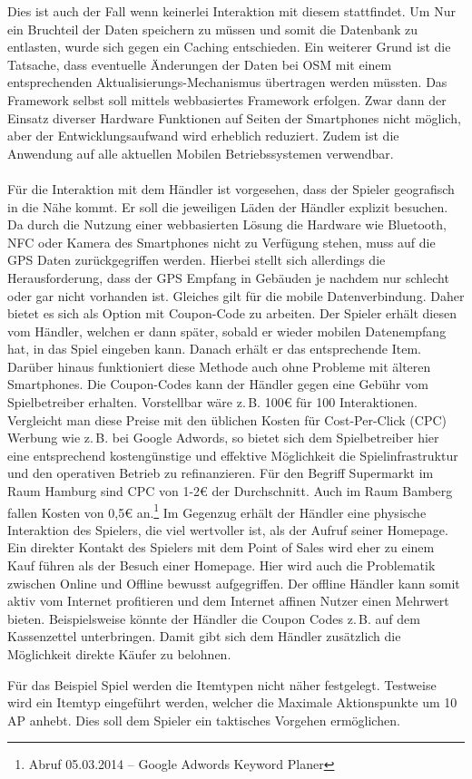 Dies ist auch der Fall wenn keinerlei Interaktion mit diesem stattfindet. Um Nur ein Bruchteil der Daten speichern zu müssen und somit die Datenbank zu entlasten, wurde sich gegen ein Caching entschieden. Ein weiterer Grund ist die Tatsache, dass eventuelle Änderungen der Daten bei OSM mit einem entsprechenden Aktualisierungs-Mechanismus übertragen werden müssten.
Das Framework selbst soll mittels webbasiertes Framework erfolgen.
Zwar dann der Einsatz diverser Hardware Funktionen auf Seiten der Smartphones nicht möglich, aber der Entwicklungsaufwand wird erheblich reduziert. Zudem ist die Anwendung auf alle aktuellen Mobilen Betriebssystemen verwendbar.
\\\\
Für die Interaktion mit dem Händler ist vorgesehen, dass der Spieler geografisch in die Nähe kommt. Er soll die jeweiligen Läden der Händler explizit besuchen. Da durch die Nutzung einer webbasierten Lösung die Hardware wie Bluetooth, NFC oder Kamera des Smartphones nicht zu Verfügung stehen, muss auf die GPS Daten zurückgegriffen werden.
Hierbei stellt sich allerdings die Herausforderung, dass der GPS Empfang in Gebäuden je nachdem nur schlecht oder gar nicht vorhanden ist. Gleiches gilt für die mobile Datenverbindung. Daher bietet es sich als Option mit Coupon-Code zu arbeiten. Der Spieler erhält diesen vom Händler, welchen er dann später, sobald er wieder mobilen Datenempfang hat, in das Spiel eingeben kann. Danach erhält er das entsprechende Item. Darüber hinaus funktioniert diese Methode auch ohne Probleme mit älteren Smartphones. Die Coupon-Codes kann der Händler gegen eine Gebühr vom Spielbetreiber erhalten. Vorstellbar wäre z.\,B. 100€ für 100 Interaktionen. Vergleicht man diese Preise mit den üblichen Kosten für Cost-Per-Click (CPC) Werbung wie z.\,B. bei Google Adwords, so bietet sich dem Spielbetreiber hier eine entsprechend kostengünstige und effektive Möglichkeit die Spielinfrastruktur und den operativen Betrieb zu refinanzieren.\cite{Guerini.2010} Für den Begriff Supermarkt im Raum Hamburg sind CPC von 1-2€ der Durchschnitt. Auch im Raum Bamberg fallen Kosten von 0,5€ an.\footnote{Abruf 05.03.2014 -- Google Adwords Keyword Planer} Im Gegenzug erhält der Händler eine physische Interaktion des Spielers, die viel wertvoller ist, als der Aufruf seiner Homepage. Ein direkter Kontakt des Spielers mit dem Point of Sales wird eher zu einem Kauf führen als der Besuch einer Homepage. Hier wird auch die Problematik zwischen Online und Offline bewusst aufgegriffen. Der offline Händler kann somit aktiv vom Internet profitieren und dem Internet affinen Nutzer einen Mehrwert bieten. Beispielsweise könnte  der Händler die Coupon Codes z.\,B. auf dem Kassenzettel unterbringen. Damit gibt sich dem Händler zusätzlich die Möglichkeit direkte Käufer zu belohnen.

Für das Beispiel Spiel werden die Itemtypen nicht näher festgelegt. Testweise wird ein Itemtyp eingeführt werden, welcher die Maximale Aktionspunkte um 10 AP anhebt. Dies soll dem Spieler ein taktisches Vorgehen ermöglichen.
